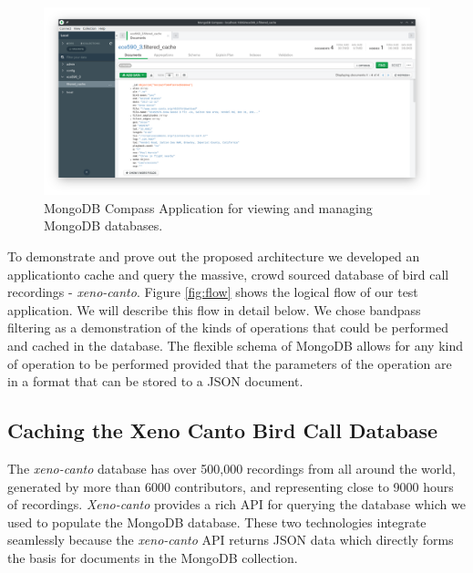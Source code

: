 \documentclass[conference,twoside]{IEEEtran}
\begin{document}
\begin{figure}  %
  \centering
  \includegraphics[width=\textwidth]{compass_screenshot}
  \caption{MongoDB Compass Application for viewing and managing MongoDB databases.}
  \label{fig:compass}
\end{figure}


To demonstrate and prove out the proposed architecture we developed an application\footnotemark to cache and query the massive, crowd sourced database of bird call recordings - \textit{xeno-canto}. Figure \ref{fig:flow} shows the logical flow of our test application. We will describe this flow in detail below. We chose bandpass filtering as a demonstration of the kinds of operations that could be performed and cached in the database. The flexible schema of MongoDB allows for any kind of operation to be performed provided that the parameters of the operation are in a format that can be stored to a JSON document.



\subsection{Caching the Xeno Canto Bird Call Database}
The \textit{xeno-canto} database has over 500,000 recordings from all around the world, generated by more than 6000 contributors, and representing close to 9000 hours of recordings\cite{xenocanto}. \textit{Xeno-canto} provides a rich API for querying the database which we used to populate the MongoDB database. These two technologies integrate seamlessly because the \textit{xeno-canto} API returns JSON data which directly forms the basis for documents in the MongoDB collection.
\end{document}
